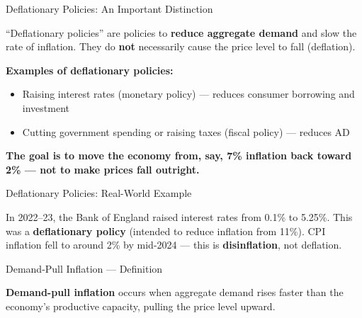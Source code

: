 \documentclass[16pt,aspectratio=169]{beamer}
\begin{document}
\begin{frame}{Deflationary Policies: An Important Distinction}
    \begin{keypoint}
        ``Deflationary policies'' are policies to \textbf{reduce aggregate demand} and slow the rate of inflation. They do \textbf{not} necessarily cause the price level to fall (deflation).
    \end{keypoint}

    \vspace{0.7em}
    \textbf{Examples of deflationary policies:}
    \begin{itemize}
        \item Raising interest rates (monetary policy) --- reduces consumer borrowing and investment
        \item Cutting government spending or raising taxes (fiscal policy) --- reduces AD
    \end{itemize}

    \vspace{0.5em}
    \textbf{The goal is to move the economy from, say, 7\% inflation back toward 2\% --- not to make prices fall outright.}
\end{frame}

\begin{frame}{Deflationary Policies: Real-World Example}
    \begin{example}
        In 2022--23, the Bank of England raised interest rates from 0.1\% to 5.25\%. This was a \textbf{deflationary policy} (intended to reduce inflation from 11\%). CPI inflation fell to around 2\% by mid-2024 --- this is \textbf{disinflation}, not deflation.
    \end{example}
\end{frame}

\begin{frame}{Demand-Pull Inflation --- Definition}
    \begin{definition}
        \textbf{Demand-pull inflation} occurs when aggregate demand rises faster than the economy's productive capacity, pulling the price level upward.
    \end{definition}
\end{frame}
\end{document}
